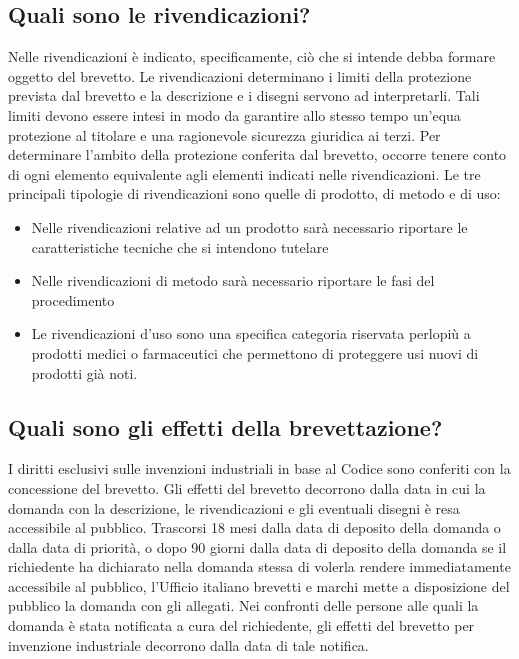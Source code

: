 \subsection{Quali sono le rivendicazioni?}
Nelle rivendicazioni è indicato, specificamente, ciò che si intende debba
formare oggetto del brevetto.
Le rivendicazioni determinano i limiti della protezione prevista dal brevetto e
la descrizione e i disegni servono ad interpretarli.
Tali limiti devono essere intesi in modo da garantire allo
stesso tempo un'equa protezione al titolare e una ragionevole sicurezza
giuridica ai terzi.\newline
Per determinare l'ambito della protezione conferita dal brevetto, occorre
tenere conto di ogni elemento equivalente agli elementi indicati nelle
rivendicazioni.\newline
\newline
Le tre principali tipologie di rivendicazioni sono quelle di prodotto, di metodo e di uso:
\begin{itemize}
    \item Nelle rivendicazioni relative ad un prodotto sarà necessario riportare le caratteristiche tecniche che si intendono tutelare
    \item Nelle rivendicazioni di metodo sarà necessario riportare le fasi del procedimento
    \item Le rivendicazioni d’uso sono una specifica categoria riservata perlopiù a prodotti medici o farmaceutici che permettono di proteggere usi nuovi di prodotti già noti.
\end{itemize}

\subsection{Quali sono gli effetti della brevettazione?}
I diritti esclusivi sulle invenzioni industriali in base al Codice sono conferiti con la concessione del brevetto. \newline
Gli effetti del brevetto decorrono dalla data in cui la domanda con la descrizione, le rivendicazioni e gli eventuali disegni è resa accessibile al pubblico.\newline
Trascorsi 18 mesi dalla data di deposito della domanda o dalla data di priorità, o dopo 90 giorni dalla data di deposito della domanda se il
richiedente ha dichiarato nella domanda stessa di volerla rendere immediatamente accessibile al pubblico, l'Ufficio italiano brevetti e marchi mette a disposizione del
pubblico la domanda con gli allegati. \newline
Nei confronti delle persone alle quali la domanda è stata notificata a cura del richiedente, gli effetti del brevetto per invenzione
industriale decorrono dalla data di tale notifica.

